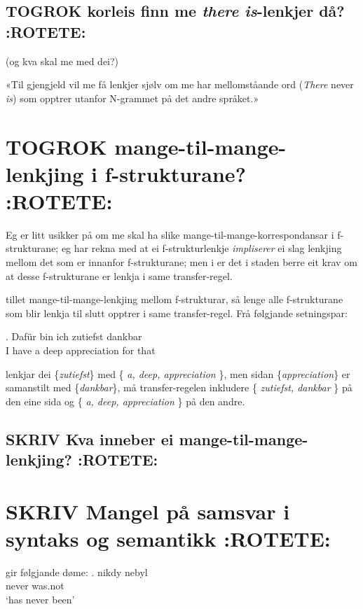 \documentclass[11pt,a4paper,oneside,draft]{book}
\begin{document}
\subsection{\textbf{TOGROK} korleis finn me \emph{there is}-lenkjer då? \textbf{:ROTETE:}}
\label{sec-3.7.3}

(og kva skal me med dei?)

«Til gjengjeld vil me få lenkjer sjølv om me har mellomståande ord
(\emph{There} never \emph{is}) som opptrer utanfor N-grammet på det andre
språket.»

\section{\textbf{TOGROK} mange-til-mange-lenkjing i f-strukturane? \textbf{:ROTETE:}}
\label{sec-3.8}

    Eg er litt usikker på om me skal ha slike
    mange-til-mange-korrespondansar i f-strukturane; eg har rekna med
    at ei f-strukturlenkje \emph{impliserer} ei slag lenkjing mellom det som
    er innanfor f-strukturane; men i \citet{riezler2006gmt} er det i
    staden berre eit krav om at desse f-strukturane er lenkja i same
    transfer-regel.


\citet[s.~40--41]{riezler2006gmt} tillet mange-til-mange-lenkjing
mellom f-strukturar, så lenge alle f-strukturane som blir lenkja til
slutt opptrer i same transfer-regel. Frå følgjande setningspar:

\ex. Dafür bin ich zutiefst dankbar \\
     I have a deep appreciation for that

lenkjar dei \{\emph{zutiefst}\} med \{ \emph{a, deep, appreciation} \}, men
sidan \{\emph{appreciation}\} er samanstilt med \{\emph{dankbar}\}, må
transfer-regelen inkludere \{ \emph{zutiefst, dankbar} \} på den eine sida
og \{ \emph{a, deep, appreciation} \} på den andre.


\subsection{\textbf{SKRIV} Kva inneber ei mange-til-mange-lenkjing? \textbf{:ROTETE:}}
\label{sec-3.8.1}


\section{\textbf{SKRIV} Mangel på samsvar i syntaks og semantikk \textbf{:ROTETE:}}
\label{sec-3.9}

\cite[s.~5]{kruijffkorbayova2006agc} gir følgjande døme: 
\ex.  nikdy nebyl \\
      never was.not\\
      `has never been'
\end{document}
